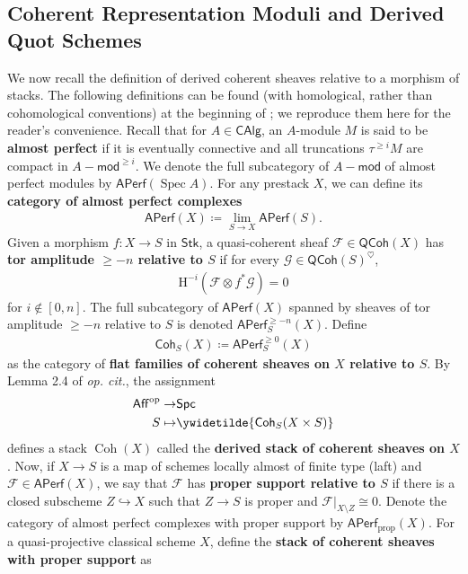 \documentclass{article}
\numberwithin{equation}{section}
\theoremstyle{quest}
\theoremstyle{definition}
\theoremstyle{remark}
\newcommand{\msf}{\mathsf}
\newcommand{\Mod}{-\msf{mod}}
\DeclareMathOperator{\Spec}{Spec}
\DeclareMathOperator{\Coh}{Coh}
\begin{document}
 \subsection{Coherent Representation Moduli and Derived Quot Schemes}\label{sec:coherent-and-quot-reps}
We now recall the definition of derived coherent sheaves relative to a morphism of stacks. The following definitions can be found (with homological, rather than cohomological conventions) at the beginning of \cite[\S2]{PS}; we reproduce them here for the reader's convenience. Recall that for $A\in \mathsf{CAlg}$, an $A$-module $M$ is said to be \textbf{almost perfect} if it is eventually connective and all truncations $\tau^{\ge i}M$ are compact in $A\Mod^{\ge i}$. We denote the full subcategory of $A\Mod$ of almost perfect modules by $\mathsf{APerf}(\Spec A)$. For any prestack $X$, we can define its \textbf{category of almost perfect complexes} 
 \begin{align*}
 	\mathsf{APerf}(X)\coloneqq \lim_{S\to X}\mathsf{APerf}(S).
 \end{align*} 
 Given a morphism $f:X\to S$ in $\mathsf{Stk}$, a quasi-coherent sheaf $\mathscr{F}\in \mathsf{QCoh}(X)$ has \textbf{tor amplitude $ {\ge - n}$ relative to $ {S}$} if for every $\mathscr{G}\in \mathsf{QCoh}(S)^\heartsuit$,
 \begin{align*}
 	\mathrm H^{-i}(\mathscr{F}\otimes f^*\mathscr{G})=0
 \end{align*} 
 for $i\notin[0,n]$. The full subcategory of $\mathsf{APerf}(X)$ spanned by sheaves of tor amplitude $\ge -n$ relative to $S$ is denoted $\mathsf{APerf}^{\ge -n}_S(X)$. Define
 \begin{align*}
 	\mathsf{Coh}_S(X)\coloneqq \mathsf{APerf}^{\ge 0}_S(X)
 \end{align*} 
 as the category of \textbf{flat families of coherent sheaves on $ {X}$ relative to $ {S}$}. By Lemma 2.4 of \textit{op. cit.}, the assignment
 \begin{align*}
	 \mathsf{Aff}^{\text{op}}\to &\mathsf{Spc}\\
	 S\mapsto &\ywidetilde{\mathsf{Coh}_S(X\times S)}
 \end{align*} 
defines a stack $\Coh(X)$ called the \textbf{derived stack of coherent sheaves on $ {X}$}. Now, if $X\to S$ is a map of schemes locally almost of finite type (laft) and $\mathscr{F}\in \mathsf{APerf}(X)$, we say that $\mathscr{F}$ has \textbf{proper support relative to $ {S}$} if there is a closed subscheme $Z\hookrightarrow X$ such that $Z\to S$ is proper and $\mathscr{F}|_{X\setminus Z}\cong 0$. Denote the category of almost perfect complexes with proper support by $\mathsf{APerf}_{\text{prop}}(X)$. For a quasi-projective classical scheme $X$, define the \textbf{stack of coherent sheaves with proper support} as
\end{document}
